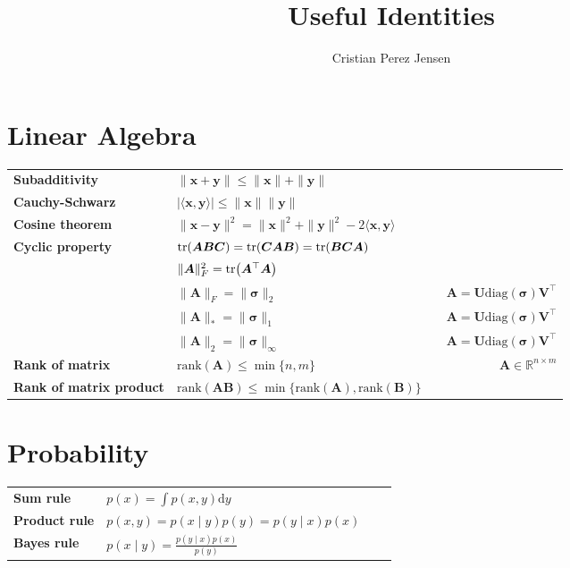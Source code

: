 \documentclass{article}
\title{\textsf{\textbf{Useful Identities}}}
\author{\textsf{Cristian Perez Jensen}}
\date{}
\newcommand{\lft}{\mathopen{}\mathclose\bgroup\left}
\newcommand{\rgt}{\aftergroup\egroup\right}
\newcommand{\R}{\mathbb{R}}
\renewcommand{\vec}[1]{\bm{#1}}
\newcommand{\mat}[1]{\bm{#1}}
\newcommand{\transpose}[1]{#1^\top}
\newcommand{\trace}[1]{\mathrm{tr}\lft(#1\rgt)}
\begin{document}
\maketitle

\section*{Linear Algebra}

\begin{xltabular}{\textwidth}{@{}llXr@{}}
    \toprule
    \textbf{Subadditivity}   & $\| \vec{x} + \vec{y} \| \leq \| \vec{x} \| + \| \vec{y} \|$ \\
    \textbf{Cauchy-Schwarz}  & $|\langle \vec{x}, \vec{y} \rangle| \leq \| \vec{x} \| \| \vec{y} \|$ \\
    \textbf{Cosine theorem}  & $\| \vec{x} - \vec{y} \|^2 = \| \vec{x} \|^2 + \| \vec{y} \|^2 - 2 \langle \vec{x}, \vec{y} \rangle$ \\
    \textbf{Cyclic property} & $\trace{\mat{A} \mat{B} \mat{C}} = \trace{\mat{C} \mat{A} \mat{B}} = \trace{\mat{B} \mat{C} \mat{A}}$ \\
    & $\| \mat{A} \|_F^2 = \trace{\transpose{\mat{A}} \mat{A}}$ \\
    & $\| \mat{A} \|_F = \| \vec{\sigma} \|_2$ & & $\mat{A} = \mat{U} \mathrm{diag}(\vec{\sigma}) \transpose{\mat{V}}$ \\
    & $\| \mat{A} \|_* = \| \vec{\sigma} \|_1$ & & $\mat{A} = \mat{U} \mathrm{diag}(\vec{\sigma}) \transpose{\mat{V}}$ \\
    & $\| \mat{A} \|_2 = \| \vec{\sigma} \|_\infty$ & & $\mat{A} = \mat{U} \mathrm{diag}(\vec{\sigma}) \transpose{\mat{V}}$ \\
    \textbf{Rank of matrix} & $\mathrm{rank}(\mat{A}) \leq \min \{n, m\}$ & & $\mat{A} \in \R^{n \times m}$ \\
    \textbf{Rank of matrix product} & $\mathrm{rank}(\mat{A} \mat{B}) \leq \min \{ \mathrm{rank}(\mat{A}), \mathrm{rank}(\mat{B}) \}$ \\
    \bottomrule
\end{xltabular}

\section*{Probability}

\begin{xltabular}{\textwidth}{@{}llXr@{}}
    \toprule
    \textbf{Sum rule}     & $p(x) = \int p(x, y) \mathrm{d}y$               & & \\
    \textbf{Product rule} & $p(x, y) = p(x \mid y) p(y) = p(y \mid x) p(x)$ & & \\
    \textbf{Bayes rule}   & $p(x \mid y) = \frac{p(y \mid x) p(x)}{p(y)}$   & & \\
    \bottomrule
\end{xltabular}
\end{document}
